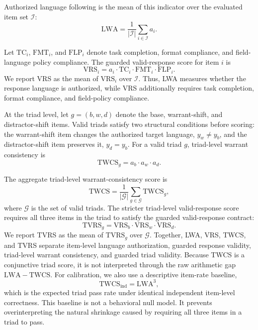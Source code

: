 \documentclass[10pt,conference]{IEEEtran}
\newcommand{\metric}[1]{\textsc{#1}}
\begin{document}
Authorized language following is the mean of this indicator over the evaluated item set $\mathcal{I}$:
\begin{equation}
\mathrm{LWA} =
\frac{1}{|\mathcal{I}|}
\sum_{i\in\mathcal{I}} a_i .
\label{eq:lwa}
\end{equation}

Let $\mathrm{TC}_i$, $\mathrm{FMT}_i$, and $\mathrm{FLP}_i$ denote task completion, format compliance, and field-language policy compliance. The guarded valid-response score for item $i$ is
\begin{equation}
\mathrm{VRS}_i =
a_i
\cdot
\mathrm{TC}_i
\cdot
\mathrm{FMT}_i
\cdot
\mathrm{FLP}_i .
\label{eq:vrs-item}
\end{equation}
We report \metric{VRS} as the mean of $\mathrm{VRS}_i$ over $\mathcal{I}$. Thus, \metric{LWA} measures whether the response language is authorized, while \metric{VRS} additionally requires task completion, format compliance, and field-policy compliance.

At the triad level, let $g=(b,w,d)$ denote the base, warrant-shift, and distractor-shift items. Valid triads satisfy two structural conditions before scoring: the warrant-shift item changes the authorized target language, $y_w \neq y_b$, and the distractor-shift item preserves it, $y_d = y_b$. For a valid triad $g$, triad-level warrant consistency is
\begin{equation}
\mathrm{TWCS}_g =
a_b
\cdot
a_w
\cdot
a_d .
\label{eq:twcs-item}
\end{equation}

The aggregate triad-level warrant-consistency score is
\begin{equation}
\mathrm{TWCS} =
\frac{1}{|\mathcal{G}|}
\sum_{g\in\mathcal{G}} \mathrm{TWCS}_g ,
\label{eq:twcs}
\end{equation}
where $\mathcal{G}$ is the set of valid triads. The stricter triad-level valid-response score requires all three items in the triad to satisfy the guarded valid-response contract:
\begin{equation}
\mathrm{TVRS}_g =
\mathrm{VRS}_b
\cdot
\mathrm{VRS}_w
\cdot
\mathrm{VRS}_d .
\label{eq:tvrs-item}
\end{equation}
We report \metric{TVRS} as the mean of $\mathrm{TVRS}_g$ over $\mathcal{G}$. Together, \metric{LWA}, \metric{VRS}, \metric{TWCS}, and \metric{TVRS} separate item-level language authorization, guarded response validity, triad-level warrant consistency, and guarded triad validity. Because \metric{TWCS} is a conjunctive triad score, it is not interpreted through the raw arithmetic gap \(\mathrm{LWA}-\mathrm{TWCS}\). For calibration, we also use a descriptive item-rate baseline,
\begin{equation}
\mathrm{TWCS}_{\mathrm{ind}} = \mathrm{LWA}^{3},
\label{eq:twcs-ind}
\end{equation}
which is the expected triad pass rate under identical independent item-level correctness. This baseline is not a behavioral null model. It prevents overinterpreting the natural shrinkage caused by requiring all three items in a triad to pass.
\end{document}
